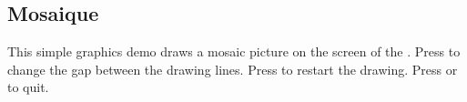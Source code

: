 %
%
\subsection{Mosaique}
This simple graphics demo draws a mosaic picture on the screen of the \dap.
Press \PluginUp{} to change the gap between the drawing lines. Press 
\PluginSelect{} to restart the drawing. Press \PluginCancel{} or \PluginExit{}
 to quit. 
